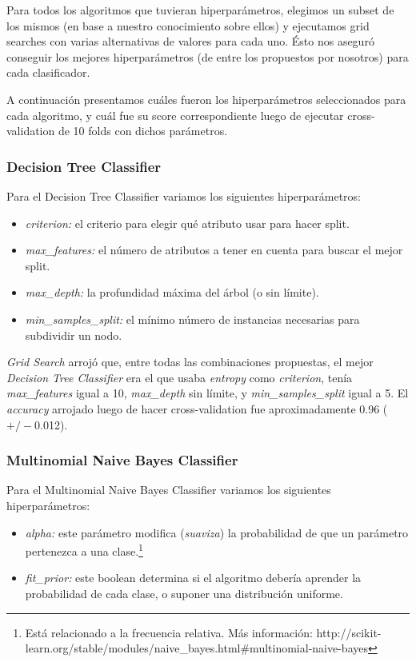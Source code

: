 \documentclass[a4paper]{article}
\begin{document}
Para todos los algoritmos que tuvieran hiperparámetros, elegimos un subset de los mismos (en base a nuestro conocimiento sobre ellos) y ejecutamos grid searches con varias alternativas de valores para cada uno. Ésto nos aseguró conseguir los mejores hiperparámetros (de entre los propuestos por nosotros) para cada clasificador. 
\newline

A continuación presentamos cuáles fueron los hiperparámetros seleccionados para cada algoritmo, y cuál fue su score correspondiente luego de ejecutar cross-validation de 10 folds con dichos parámetros.

\subsubsection{Decision Tree Classifier}
Para el Decision Tree Classifier variamos los siguientes hiperparámetros:
\begin{itemize}
	\item \textit{criterion:} el criterio para elegir qué atributo usar para hacer split.
	\item \textit{max\_features:} el número de atributos a tener en cuenta para buscar el mejor split.
	\item \textit{max\_depth:} la profundidad máxima del árbol (o sin límite).
	\item \textit{min\_samples\_split:} el mínimo número de instancias necesarias para subdividir un nodo.
\end{itemize}

\textit{Grid Search} arrojó que, entre todas las combinaciones propuestas, el mejor \textit{Decision Tree Classifier} era el que usaba \textit{entropy} como \textit{criterion}, tenía \textit{max\_features} igual a 10, \textit{max\_depth} sin límite, y \textit{min\_samples\_split} igual a 5. \newline
\indent El \textit{accuracy} arrojado luego de hacer cross-validation fue aproximadamente 0.96 ($+/-$0.012).

\subsubsection{Multinomial Naive Bayes Classifier}
Para el Multinomial Naive Bayes Classifier variamos los siguientes hiperparámetros:
\begin{itemize}
	\item \textit{alpha:} este parámetro modifica (\textit{suaviza}) la probabilidad de que un parámetro pertenezca a una clase.\footnote{Está relacionado a la frecuencia relativa. Más información: http://scikit-learn.org/stable/modules/naive_bayes.html\#multinomial-naive-bayes}
	\item \textit{fit\_prior:} este boolean determina si el algoritmo debería aprender la probabilidad de cada clase, o suponer una distribución uniforme.
\end{itemize}
\end{document}
